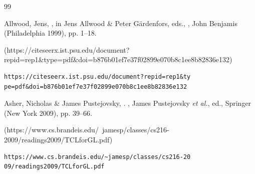 
\let\oldbibItem\bibItem
\def\bibItem{\oldbibItem}


\vspace{1.5em}

\begin{thebibliography}{99}

\vspace{.5em}

\setlength{\parskip}{0pt}
\setlength{\itemsep}{-3pt}



\thispagestyle{bib}

\ifnum{}\else{}\fi

{\fontsize{8}{10}\selectfont





\condenlargepage{3em}

\begin{bItem}[JensAllwood]
Allwood, Jens, , in 
Jens Allwood \& Peter G\"ardenfors, eds.,
, 
John Benjamis (Philadelphia 1999), pp. 1--18.
%
\begin{boxurl}(https://citeseerx.ist.psu.edu/document?repid=rep1&type=pdf&doi=b876b01ef7e37f02899e070b8c1ee8b82836e132)
\begin{lstlisting}
https://citeseerx.ist.psu.edu/document?repid=rep1&ty
pe=pdf&doi=b876b01ef7e37f02899e070b8c1ee8b82836e132
\end{lstlisting}
\end{boxurl}\end{bItem}





\begin{bItem}[AsherPustejovsky]
Asher, Nicholas \& James Pustejovsky, 
.
, 
James Pustejovsky \textit{et al.}, ed., 
Springer (New York 2009), pp. 39--66.
%
\begin{boxurl}(https://www.cs.brandeis.edu/~jamesp/classes/cs216-2009/readings2009/TCLforGL.pdf)
\begin{lstlisting}
https://www.cs.brandeis.edu/~jamesp/classes/cs216-20
09/readings2009/TCLforGL.pdf
\end{lstlisting}
\end{boxurl}\end{bItem}



}
\end{thebibliography}

